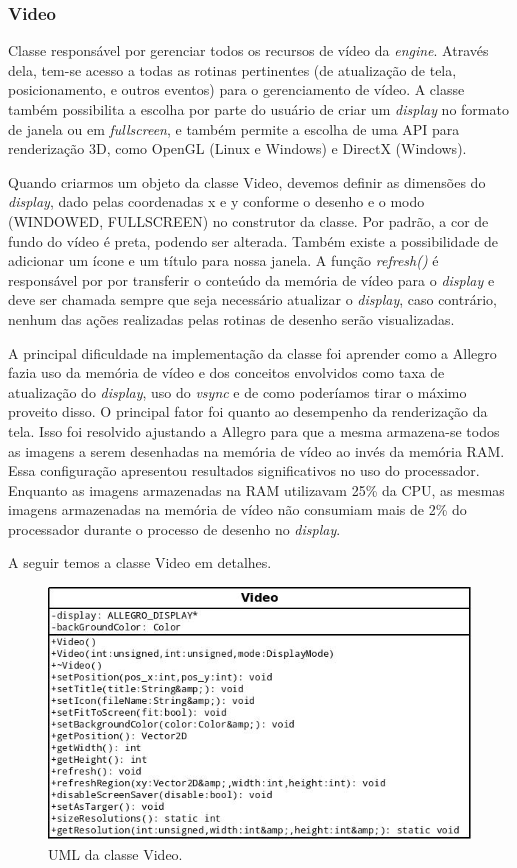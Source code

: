 \subsubsection{Video}
%
%
Classe responsável por gerenciar todos os recursos de vídeo da \textit{engine}. Através dela, tem-se acesso a todas as rotinas pertinentes (de atualização de tela, posicionamento, e outros eventos) para o gerenciamento de vídeo. A classe também possibilita a escolha por parte do usuário de criar um \textit{display} no formato de janela ou em \textit{fullscreen}, e também permite a escolha de uma API para renderização 3D, como OpenGL (Linux e Windows) e DirectX (Windows). 
\par 
Quando criarmos um objeto da classe Video, devemos definir as dimensões do \textit{display}, dado pelas coordenadas x e y conforme o desenho e o modo (WINDOWED, FULLSCREEN) no construtor da classe. Por padrão, a cor de fundo do vídeo é preta, podendo ser alterada. Também existe a possibilidade de adicionar um ícone e um título para nossa janela. A função \textit{refresh()} é responsável por por transferir o conteúdo da memória de vídeo para o \textit{display} e deve ser chamada sempre que seja necessário atualizar o \textit{display}, caso contrário, nenhum das ações realizadas pelas rotinas de desenho serão visualizadas. 
\par 
A principal dificuldade na implementação da classe foi aprender como a Allegro fazia uso da memória de vídeo e dos conceitos envolvidos como taxa de atualização do \textit{display}, uso do \textit{vsync} e de como poderíamos tirar o máximo proveito disso. O principal fator foi quanto ao desempenho da renderização da tela. Isso foi resolvido ajustando a Allegro para que a mesma armazena-se todos as imagens a serem desenhadas na memória de vídeo ao invés da memória RAM. Essa configuração apresentou resultados significativos no uso do processador. Enquanto as imagens armazenadas na RAM utilizavam 25\% da CPU, as mesmas imagens armazenadas na memória de vídeo não consumiam mais de 2\% do processador durante o processo de desenho no \textit{display}.
\par
A seguir temos a classe Video em detalhes.
%
%
%
%
\begin{figure}[H]
    \centering
    \includegraphics[scale = 0.5]{uml/video.jpeg}
    \caption{UML da classe Video.}
    \label{umlVideo}
\end{figure}
